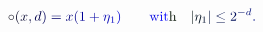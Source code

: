 \documentclass[12pt]{article}
\begin{document}
\makeatletter
\renewcommand*{\@textcolor}[3]{%
  \protect\leavevmode
  \begingroup
    \color#1{#2}#3%
  \endgroup
}
\makeatother
\begin{displaymath}
\mathcolor[RGB]{0,0,15}{\circ} \mathcolor[RGB]{0,0,30}{(} \mathcolor[RGB]{0,0,45}{x} \mathcolor[RGB]{0,0,60}{,} \mathcolor[RGB]{0,0,75}{d} \mathcolor[RGB]{0,0,90}{)} \mathcolor[RGB]{0,0,105}{=} \mathcolor[RGB]{0,0,120}{x} \mathcolor[RGB]{0,0,135}{(} \mathcolor[RGB]{0,0,150}{1} \mathcolor[RGB]{0,0,165}{+} \mathcolor[RGB]{0,0,180}{\eta} _ { \mathcolor[RGB]{0,0,195}{1} } \mathcolor[RGB]{0,0,210}{)} \qquad \mathrm { \mathcolor[RGB]{0,0,225}{w} \mathcolor[RGB]{0,0,240}{i} \mathcolor[RGB]{0,0,255}{t} \mathcolor[RGB]{0,15,0}{h} } \quad \mathcolor[RGB]{0,15,15}{|} \mathcolor[RGB]{0,15,30}{\eta} _ { \mathcolor[RGB]{0,15,45}{1} } \mathcolor[RGB]{0,15,60}{|} \mathcolor[RGB]{0,15,75}{\le} \mathcolor[RGB]{0,15,90}{2} ^ { \mathcolor[RGB]{0,15,105}{-} \mathcolor[RGB]{0,15,120}{d} } \mathcolor[RGB]{0,15,135}{.}
\end{displaymath}
\end{document}
